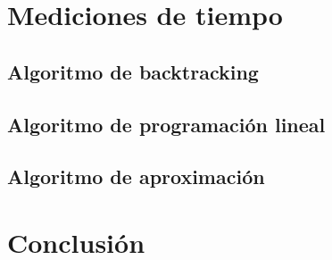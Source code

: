 \documentclass{article}
\begin{document}
\section{Mediciones de tiempo}
\label{sec:medTiempo}
\subsection{Algoritmo de backtracking}
\subsection{Algoritmo de programación lineal}
\subsection{Algoritmo de aproximación}


\section{Conclusión}
\end{document}
